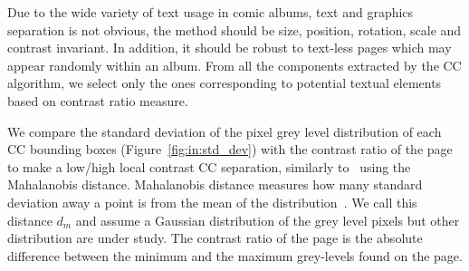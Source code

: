 
Due to the wide variety of text usage in comic albums, text and graphics separation is not obvious, the method should be size, position, rotation, scale and contrast invariant.
In addition, it should be robust to text-less pages which may appear randomly within an album.
From all the components extracted by the CC algorithm, we select only the ones corresponding to potential textual elements based on contrast ratio measure.




We compare the standard deviation of the pixel grey level distribution of each CC bounding boxes (Figure~\ref{fig:in:std_dev}) with the contrast ratio of the page to make a low/high local contrast CC separation, similarly to~\cite{Li2013Unsupervised} using the Mahalanobis distance.
Mahalanobis distance measures how many standard deviation away a point is from the mean of the distribution~\cite{mahalanobis1936generalized,de2000mahalanobis}.
We call this distance $d_m$ and assume a Gaussian distribution of the grey level pixels but other distribution are under study.
The contrast ratio of the page is the absolute difference between the minimum and the maximum grey-levels found on the page.



